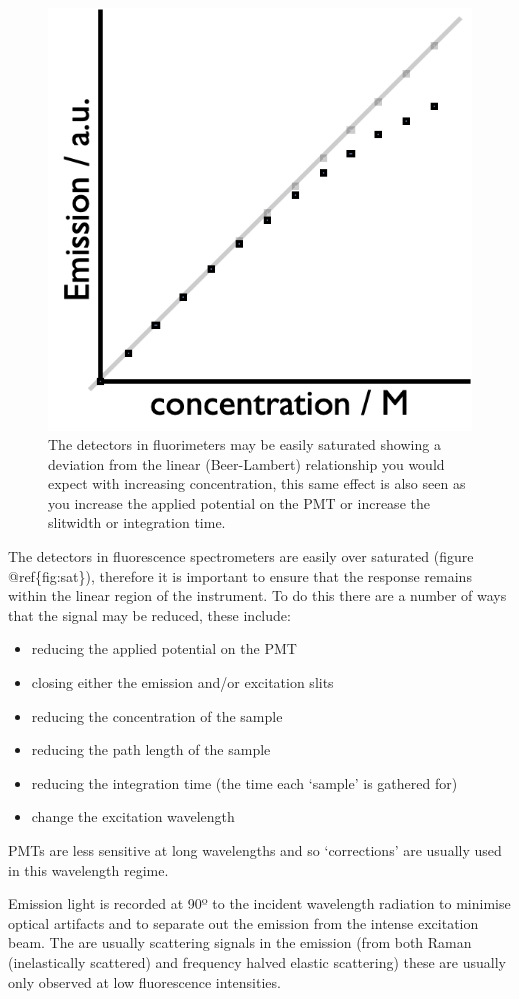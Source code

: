 \documentclass[
]{book}
\providecommand{\tightlist}{%
  \setlength{\itemsep}{0pt}\setlength{\parskip}{0pt}}
\begin{document}
\begin{figure}

{\centering \includegraphics[width=0.4\linewidth]{images/sat} 

}

\caption{The detectors in fluorimeters may be easily saturated showing a deviation from the linear (Beer-Lambert) relationship you would expect with increasing concentration, this same effect is also seen as you increase the applied potential on the PMT or increase the slitwidth or integration time.}\label{fig:sat}
\end{figure}

The detectors in fluorescence spectrometers are easily over saturated (figure @ref\{fig:sat\}), therefore it is important to ensure that the response remains within the linear region of the instrument. To do this there are a number of ways that the signal may be reduced, these include:

\begin{itemize}
\tightlist
\item
  reducing the applied potential on the PMT
\item
  closing either the emission and/or excitation slits
\item
  reducing the concentration of the sample
\item
  reducing the path length of the sample
\item
  reducing the integration time (the time each `sample' is gathered for)
\item
  change the excitation wavelength
\end{itemize}

PMTs are less sensitive at long wavelengths and so `corrections' are usually used in this wavelength regime.

Emission light is recorded at 90º to the incident wavelength radiation to minimise optical artifacts and to separate out the emission from the intense excitation beam. The are usually scattering signals in the emission (from both Raman (inelastically scattered) and frequency halved elastic scattering) these are usually only observed at low fluorescence intensities.
\end{document}
